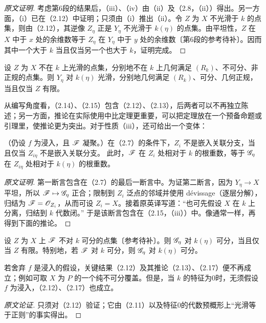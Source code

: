 \begin{proof}[原文证明]
考虑第6段的结果后，（iii）、（iv）由（ii）及（2.8，（ii））得出。另一方面，（i）已在（2.12）中证明；只须由（i）推出（ii）。令 $Z$ 为 $X$ 不光滑于 $k$ 的点集，则由（2.12），其逆像 $Z_\eta$ 正是 $Y_\eta$ 不光滑于 $k(\eta)$ 的点集。由平坦性，$Z$ 在 $X$ 中于 $x$ 处的余维数等于 $Z_\eta$ 在 $Y_\eta$ 中于 $y$ 处的余维数〔第6段的参考待补〕。因而其中一个大于 $k$ 当且仅当另一个也大于 $k$，证明完成。
\end{proof}

设 $Z$ 为 $X$ 不在 $k$ 上光滑的点集，分别地不在 $k$ 上几何满足 $(R_k)$、不可分、非正规的点集。则 $Y_\eta$ 对 $k(\eta)$ 光滑，分别地几何满足 $(R_k)$、可分、几何正规，当且仅当 $Z$ 有限。

从编写角度看，（2.14）、（2.15）包含（2.12）、（2.13），后两者可以不再独立陈述；另一方面，推论在实际使用中比定理更重要，可以把定理放在一个预备命题或引理里，使推论更为突出。对于性质（iii），还可给出一个变体：

（仍设 $f$ 为浸入，且 $\mathscr F$ 凝聚。）在（2.7）的条件下，$Z_i$ 不是嵌入关联分支，当且仅当 $Z_{i\eta}$ 不是嵌入关联分支。
此时，$\mathscr F$ 在 $Z_i$ 处相对于 $k$ 的根重数，等于 $\mathscr G_\eta$ 在 $Z_{i\eta}$ 处相对于 $k(\eta)$ 的根重数。
\begin{proof}[原文证明]
第一断言包含在（2.7）的最后一断言中。为证第二断言，因为 $Y_\eta\to X$ 平坦，所以 $\mathscr F\mapsto\mathscr G_\eta$ 正合；限制到 $Z_i$ 泛点的邻域并使用 dévissage（逐层分解），归结为 $\mathscr F=\mathscr O_{Z_i}$，从而可设 $Z_i=X$。接着原英译写道：“也可先假设 $X$ 在 $k$ 上分离，归结到 $k$ 代数闭。”
于是该断言包含在（2.15，（iii））中。像通常一样，再得到下面的推论。
\end{proof}

设 $Z$ 为 $X$ 上 $\mathscr F$ 不对 $k$ 可分的点集〔参考待补〕。则 $\mathscr G_\eta$ 对 $k(\eta)$ 可分，当且仅当 $Z$ 有限。特别地，若 $\mathscr F$ 对 $k$ 可分，则 $\mathscr G_\eta$ 对 $k(\eta)$ 可分。

若舍弃 $f$ 是浸入的假设，关键结果（2.12）及其推论（2.13）、（2.17）便不再成立；例如可取 $X$ 为 $P$ 的一个纯不可分覆盖。但是，当 $k$ 的特征为0时，无须假设 $f$ 为浸入，（2.12）、（2.17）也成立。
\begin{proof}[原文论证]
只须对（2.12）验证；它由（2.11）以及特征0的代数预概形上“光滑等于正则”的事实得出。
\end{proof}

